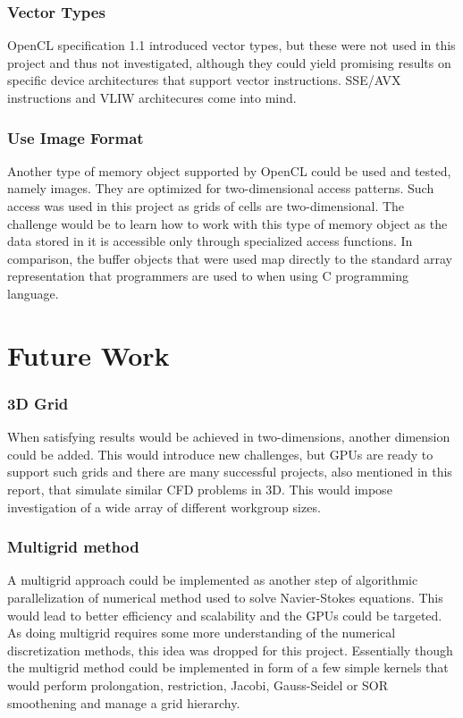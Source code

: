 \subsubsection{Vector Types}
OpenCL specification 1.1 introduced vector types, but these were not used in this project and thus not investigated, although they could yield promising results on specific device architectures that support vector instructions. SSE/AVX instructions and VLIW architecures come into mind.

\subsubsection{Use Image Format}
Another type of memory object supported by OpenCL could be used and tested, namely images. They are optimized for two-dimensional access patterns. Such access was used in this project as grids of cells are two-dimensional. The challenge would be to learn how to work with this type of memory object as the data stored in it is accessible only through specialized access functions. In comparison, the buffer objects that were used map directly to the standard array representation that programmers are used to when using C programming language.

\section{Future Work}

\subsubsection{3D Grid}
When satisfying results would be achieved in two-dimensions, another dimension could be added. This would introduce new challenges, but GPUs are ready to support such grids and there are many successful projects, also mentioned in this report, that simulate similar CFD problems in 3D. This would impose investigation of a wide array of different workgroup sizes.

\subsubsection{Multigrid method}
A multigrid approach could be implemented as another step of algorithmic parallelization of numerical method used to solve Navier-Stokes equations. This would lead to better efficiency and scalability and the GPUs could be targeted. As doing multigrid requires some more understanding of the numerical discretization methods, this idea was dropped for this project. Essentially though the multigrid method could be implemented in form of a few simple kernels that would perform prolongation, restriction, Jacobi, Gauss-Seidel or SOR smoothening and manage a grid hierarchy.

